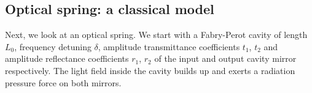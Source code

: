 \documentclass[%
 reprint,
 amsmath,amssymb,
 aps,
]{revtex4-1}
\begin{document}



\subsection{Optical spring: a classical model}
Next, we look at an optical spring.
We start with a Fabry-Perot  cavity of length 
$L_0$, frequency detuning $\delta$, amplitude transmittance coefficients $t_1$, $t_2$  and amplitude reflectance coefficients $r_1$, $r_2$ of the input and output cavity mirror respectively. 
The light field inside the cavity builds up and exerts a radiation pressure force on both mirrors.
\end{document}
